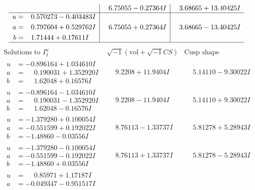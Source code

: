 \documentclass[1p]{elsarticle_modified}
\theoremstyle{definition}
\newcommand{\I}{\sqrt{-1}}
\begin{document}
$$\begin{array}{c|c|c}
 & \phantom{-}6.75055 - 0.27364 I & \phantom{-}3.68665 + 13.40425 I \\ \hline\begin{aligned}
u &= \phantom{-}0.570273 - 0.403483 I \\
a &= \phantom{-}0.797604 + 0.529762 I \\
b &= \phantom{-}1.71444 + 0.17611 I\end{aligned}
 & \phantom{-}6.75055 + 0.27364 I & \phantom{-}3.68665 - 13.40425 I\\
 \hline 
 \end{array}$$\newpage$$\begin{array}{c|c|c}  
\text{Solutions to }I^u_{1}& \I (\text{vol} + \sqrt{-1}CS) & \text{Cusp shape}\\
 \hline 
\begin{aligned}
u &= -0.896164 + 1.034610 I \\
a &= \phantom{-}0.190031 + 1.352920 I \\
b &= \phantom{-}1.62048 + 0.16576 I\end{aligned}
 & \phantom{-}9.2208 + 11.9404 I & \phantom{-}5.14110 - 9.30022 I \\ \hline\begin{aligned}
u &= -0.896164 - 1.034610 I \\
a &= \phantom{-}0.190031 - 1.352920 I \\
b &= \phantom{-}1.62048 - 0.16576 I\end{aligned}
 & \phantom{-}9.2208 - 11.9404 I & \phantom{-}5.14110 + 9.30022 I \\ \hline\begin{aligned}
u &= -1.379280 + 0.100054 I \\
a &= -0.551599 + 0.192022 I \\
b &= -1.48860 - 0.03556 I\end{aligned}
 & \phantom{-}8.76113 - 1.33737 I & \phantom{-}5.81278 + 5.28943 I \\ \hline\begin{aligned}
u &= -1.379280 - 0.100054 I \\
a &= -0.551599 - 0.192022 I \\
b &= -1.48860 + 0.03556 I\end{aligned}
 & \phantom{-}8.76113 + 1.33737 I & \phantom{-}5.81278 - 5.28943 I \\ \hline\begin{aligned}
u &= \phantom{-}0.85971 + 1.17187 I \\
a &= -0.049347 - 0.951517 I \\

\end{aligned}
\end{array}$$
\end{document}
